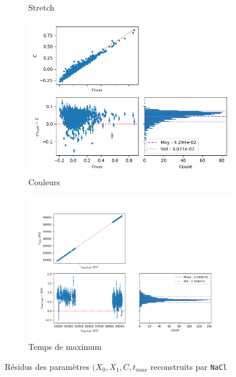 \documentclass{book}
\def\nacl{\texttt{NaCl}\xspace}
\begin{document}
\begin{figure}[h]
\begin{subfigure}{0.45\textwidth}
		\caption{Stretch}
		\label{fig:nacl_x1}
	\end{subfigure}
	\hfill
	\begin{subfigure}{0.45\textwidth}
		\centering
		\includegraphics[width=\textwidth]{figures/nacl_c.png}
		\caption{Couleurs}
		\label{fig:nacl_c}
	\end{subfigure}
	\hfill
	\begin{subfigure}{0.45\textwidth}
		\centering
		\includegraphics[width=\textwidth]{figures/nacl_tmax.png}
		\caption{Temps de maximum }
		\label{fig:nacl_tmax}
	\end{subfigure}
	\caption{Résidus des paramètres $(X_0, X_1, C, t_{max}$ reconstruits par \nacl}
	\label{fig:nacl_residuals}
\end{figure}
\end{document}
